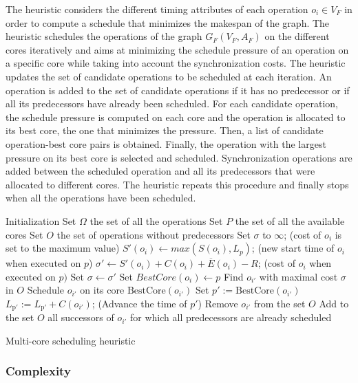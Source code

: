 The heuristic considers the different timing attributes of each operation $o_i \in V_F$ in order to compute a schedule that minimizes the makespan of the graph. The heuristic schedules the operations of the graph $G_F(V_F,A_F)$ on the different cores iteratively and aims at minimizing the schedule pressure of an operation on a specific core while taking into account the synchronization costs. %
The heuristic updates the set of candidate operations to be scheduled at each iteration. An operation is added to the set of candidate operations if it has no predecessor or if all its predecessors have already been scheduled. For each candidate operation, the schedule pressure is computed on each core and the operation is allocated to its best core, the one that minimizes the pressure. Then, a list of candidate operation-best core pairs is obtained. Finally, the operation with the largest pressure on its best core is selected and scheduled. Synchronization operations are added between the scheduled operation and all its predecessors that were allocated to different cores. The heuristic repeats this procedure and finally stops when all the operations have been scheduled.   

\begin{algorithm}[!htp]		
	  Initialization\;
		Set $\Omega$ the set of all the operations\;  
		Set $P$ the set of all the available cores\; 
 		Set $O$ the set of operations without predecessors\;  		
		{
			{
 				Set $\sigma$ to $\infty$; (cost of $o_i$ is set to the maximum value)\;
				{
  				$S'(o_i) \leftarrow max(S(o_i) , L_p)$; (new start time of $o_i$ when executed on $p$)\;
  				$\sigma' \leftarrow S'(o_i) + C(o_i) + \overline{E}(o_i) - R$; (cost of $o_i$ when executed on $p)$\;
					{
  					Set $\sigma \leftarrow \sigma'$\;
  					Set $BestCore(o_i) \leftarrow p$\;
  				}
  			}
  		 }
  		 Find $o_{i'}$ with maximal cost $\sigma$ in $O$\; 
  		 Schedule $o_{i'}$ on its core $\mathrm{BestCore}(o_{i'})$\;
  		 Set $p' := \mathrm{BestCore}(o_{i'})$\;
  		 $L_{\mathrm{p'}} := L_{\mathrm{p'}} + C(o_{i'})$; (Advance the time of $p'$)\;
  		 Remove $o_{i'}$ from the set $O$\;
  		 Add to the set $O$ all successors of $o_{i'}$ for which all predecessors are already scheduled\;
		}
	\caption{Multi-core scheduling heuristic}
	\label{algo:sched}
\end{algorithm}

\subsubsection{Complexity}

